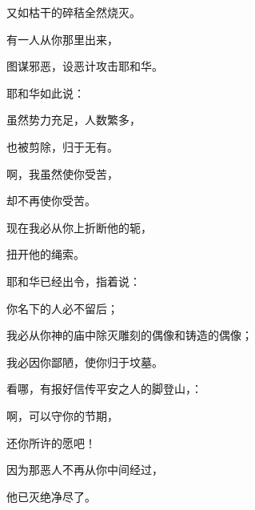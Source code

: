 {\par }{\Q 又如枯干的碎秸全然烧灭。
\par }{\BB \par }{\Q {}有一人从你那里出来，
\par }{\Q 图谋邪恶，设恶计攻击耶和华。
\par }{\Q {}耶和华如此说：
\par }{虽然势力充足，人数繁多，
\par }{\Q 也被剪除，归于无有。
\par }{啊，我虽然使你受苦，
\par }{\Q 却不再使你受苦。
\par }{\Q {}现在我必从你{}上折断他的轭，
\par }{\Q 扭开他的绳索。
\par }{\Q {}耶和华已经出令，指着{}说：
\par }{\Q 你名下的人必不留后；
\par }{\Q 我必从你神的庙中除灭雕刻的偶像和铸造的偶像；
\par }{\Q 我必因你鄙陋，使你归于坟墓。
\par }{\BB \par }{\Q {}看哪，有报好信传平安之人的脚登山，{}：
\par }{啊，可以守你的节期，
\par }{\Q 还你所许的愿吧！
\par }{\Q 因为那恶人不再从你中间经过，
\par }{\Q 他已灭绝净尽了。

}
